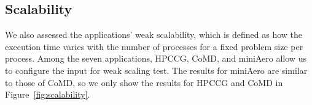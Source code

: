 \subsection{Scalability}

We also assessed the applications' weak scalability, which is defined as how the execution time varies with the number of processes for a fixed problem size per process.
Among the seven applications, HPCCG, CoMD, and miniAero allow us to configure the input for weak scaling test. The results for miniAero are similar to those of CoMD, so we only show the results for HPCCG and CoMD in Figure~\ref{fig:scalability}. %


